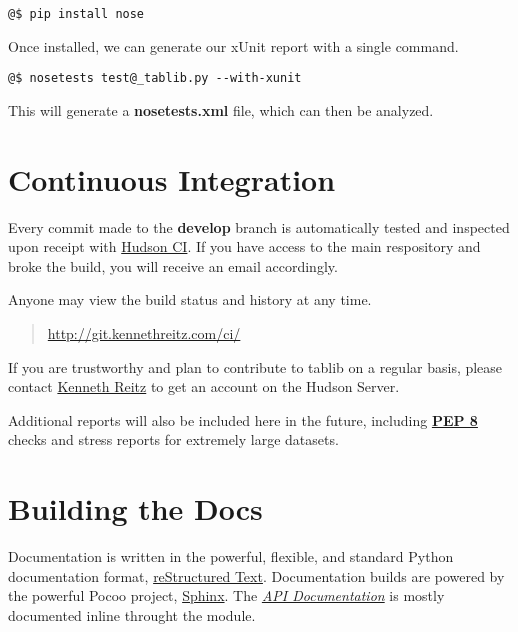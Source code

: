\documentclass[a4paper,12pt,english]{sphinxmanual}
\begin{document}
\begin{Verbatim}[commandchars=@\[\]]
@$ pip install nose
\end{Verbatim}

Once installed, we can generate our xUnit report with a single command.

\begin{Verbatim}[commandchars=@\[\]]
@$ nosetests test@_tablib.py --with-xunit
\end{Verbatim}

This will generate a \textbf{nosetests.xml} file, which can then be analyzed.


\section{Continuous Integration}
\label{development:continuous-integration}\label{development:hudson}
Every commit made to the \textbf{develop} branch is automatically tested and inspected upon receipt with \href{http://hudson.dev.java.net}{Hudson CI}. If you have access to the main respository and broke the build, you will receive an email accordingly.

Anyone may view the build status and history at any time.
\begin{quote}

\href{http://git.kennethreitz.com/ci/}{http://git.kennethreitz.com/ci/}
\end{quote}

If you are trustworthy and plan to contribute to tablib on a regular basis, please contact \href{http://kennethreitz.com/contact-me/}{Kenneth Reitz} to get an account on the Hudson Server.

Additional reports will also be included here in the future, including \href{http://www.python.org/dev/peps/pep-0008}{\textbf{PEP 8}} checks and stress reports for extremely large datasets.


\section{Building the Docs}
\label{development:docs}\label{development:building-the-docs}
Documentation is written in the powerful, flexible, and standard Python documentation format, \href{http://docutils.sourceforge.net/rst.html}{reStructured Text}.
Documentation builds are powered by the powerful Pocoo project, \href{http://sphinx.pocoo.org}{Sphinx}. The {\hyperref[api:api]{\emph{API Documentation}}} is mostly documented inline throught the module.
\end{document}
